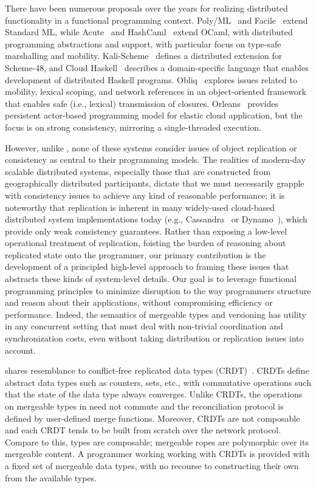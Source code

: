 There have been numerous proposals over the years for realizing distributed
functionality in a functional programming context. Poly/ML~\cite{Mat97} and
Facile~\cite{TLK+93} extend Standard ML, while Acute~\cite{SLW+05} and
HashCaml~\cite{BSS+06} extend OCaml, with distributed programming abstractions
and support, with particular focus on type-safe marshalling and mobility.
Kali-Scheme~\cite{CJK95} defines a distributed extension for Scheme-48, and
Cloud Haskell~\cite{EBPJ11} describes a domain-specific language that enables
development of distributed Haskell programs. Obliq~\cite{Car95} explores issues
related to mobility, lexical scoping, and network references in an
object-oriented framework that enables safe (i.e., lexical) transmission of
closures. Orleans~\cite{Orleans} provides persistent actor-based programming
model for elastic cloud application, but the focus is on strong consistency,
mirroring a single-threaded execution.

However, unlike \name, none of these systems consider issues of object
replication or consistency as central to their programming models. The
realities of modern-day scalable distributed systems, especially those that are
constructed from geographically distributed participants, dictate that we must
necessarily grapple with consistency issues to achieve any kind of reasonable
performance; it is noteworthy that replication is inherent in many widely-used
cloud-based distributed system implementations today (e.g.,
Cassandra~\cite{Cassandra} or Dynamo~\cite{Dynamo}), which provide only weak
consistency guarantees.  Rather than exposing a low-level operational treatment
of replication, foisting the burden of reasoning about replicated state onto
the programmer, our primary contribution is the development of a principled
high-level approach to framing these issues that abstracts these kinds of
system-level details.  Our goal is to leverage functional programming
principles to minimize disruption to the way programmers structure and reason
about their applications, without compromising efficiency or performance.
Indeed, the semantics of mergeable types and versioning has utility in any
concurrent setting that must deal with non-trivial coordination and
synchronization costs, even without taking distribution or replication issues
into account.

\name shares resemblance to conflict-free replicated data types
(CRDT)~\cite{crdt}. CRDTs define abstract data types such as counters, sets,
etc., with commutative operations such that the state of the data type always
converges. Unlike CRDTs, the operations on mergeable types in \name need not
commute and the reconciliation protocol is defined by user-defined merge
functions. Moreover, CRDTs are not composable and each CRDT tends to be built
from scratch over the network protocol. Compare to this, \name types are
composable; mergeable ropes are polymorphic over its mergeable content. A
programmer working working with CRDTs is provided with a fixed set of mergeable
data types, with no recourse to constructing their own from the available
types.


